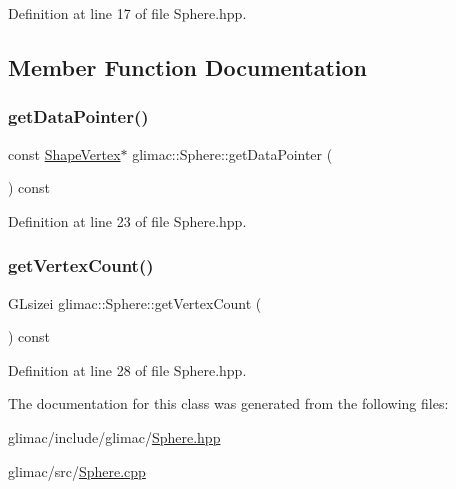 Definition at line 17 of file Sphere.\+hpp.



\subsection{Member Function Documentation}
\mbox{\label{classglimac_1_1_sphere_acff10a50f36ef2c1b365ff8cb81b1f5f}} 
\subsubsection{\texorpdfstring{get\+Data\+Pointer()}{getDataPointer()}}
{\footnotesize\ttfamily const \hyperlink{structglimac_1_1_shape_vertex}{Shape\+Vertex}$\ast$ glimac\+::\+Sphere\+::get\+Data\+Pointer (\begin{DoxyParamCaption}{ }\end{DoxyParamCaption}) const\hspace{0.3cm}{\ttfamily [inline]}}



Definition at line 23 of file Sphere.\+hpp.

\mbox{\label{classglimac_1_1_sphere_af413d827ffe392ca91770858d8d97285}} 
\subsubsection{\texorpdfstring{get\+Vertex\+Count()}{getVertexCount()}}
{\footnotesize\ttfamily G\+Lsizei glimac\+::\+Sphere\+::get\+Vertex\+Count (\begin{DoxyParamCaption}{ }\end{DoxyParamCaption}) const\hspace{0.3cm}{\ttfamily [inline]}}



Definition at line 28 of file Sphere.\+hpp.



The documentation for this class was generated from the following files\+:\begin{DoxyCompactItemize}
\item 
glimac/include/glimac/\hyperlink{_sphere_8hpp}{Sphere.\+hpp}\item 
glimac/src/\hyperlink{_sphere_8cpp}{Sphere.\+cpp}\end{DoxyCompactItemize}
